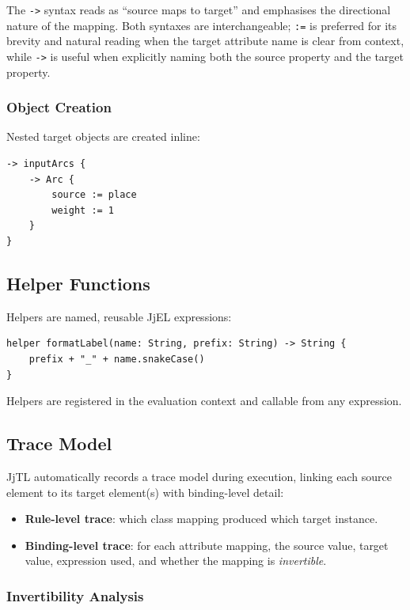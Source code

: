 \documentclass[11pt,a4paper]{article}
\newcommand{\jjel}{\textsf{JjEL}}
\newcommand{\jjtl}{\textsf{JjTL}}
\begin{document}
The \texttt{->} syntax reads as ``source maps to target'' and emphasises the directional nature of the mapping. Both syntaxes are interchangeable; \texttt{:=} is preferred for its brevity and natural reading when the target attribute name is clear from context, while \texttt{->} is useful when explicitly naming both the source property and the target property.

\subsubsection{Object Creation}

Nested target objects are created inline:
\begin{lstlisting}[style=jjtl,numbers=none]
-> inputArcs {
    -> Arc {
        source := place
        weight := 1
    }
}
\end{lstlisting}


\subsection{Helper Functions}

Helpers are named, reusable \jjel{} expressions:
\begin{lstlisting}[style=jjtl,numbers=none]
helper formatLabel(name: String, prefix: String) -> String {
    prefix + "_" + name.snakeCase()
}
\end{lstlisting}

Helpers are registered in the evaluation context and callable from any expression.


\subsection{Trace Model}

\jjtl{} automatically records a trace model during execution, linking each source element to its target element(s) with binding-level detail:

\begin{itemize}
    \item \textbf{Rule-level trace}: which class mapping produced which target instance.
    \item \textbf{Binding-level trace}: for each attribute mapping, the source value, target value, expression used, and whether the mapping is \emph{invertible}.
\end{itemize}

\subsubsection{Invertibility Analysis}
\end{document}
